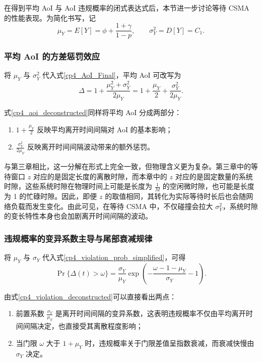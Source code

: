 在得到平均 AoI 与 AoI 违规概率的闭式表达式后，本节进一步讨论等待 CSMA 的性能表现。为简化书写，记
\[
\mu_Y = E[Y] = \phi + \frac{1+\gamma}{1-p},\qquad
\sigma_Y^2 = D[Y] = C_1.
\]

\subsubsection{平均 AoI 的方差惩罚效应}

将 $\mu_Y$ 与 $\sigma_Y^2$ 代入式\eqref{cp4_AoI_Final}，平均 AoI 可改写为
\begin{equation}\label{cp4_aoi_deconstructed}
    \Delta = 1 + \frac{\mu_Y^2 + \sigma_Y^2}{2\mu_Y}
    = 1 + \frac{\mu_Y}{2} + \frac{\sigma_Y^2}{2\mu_Y}.
\end{equation}

式\eqref{cp4_aoi_deconstructed}同样将平均 AoI 分成两部分：
\begin{enumerate}[wide]
    \item $1 + \frac{\mu_Y}{2}$ 反映平均离开时间间隔对 AoI 的基本影响；
    \item $\frac{\sigma_Y^2}{2\mu_Y}$ 反映离开时间间隔波动带来的额外惩罚。
\end{enumerate}

与第三章相比，这一分解在形式上完全一致，但物理含义更为复杂。第三章中的等待窗口 $z$ 对应的是固定长度的离散时隙，而本章中的 $z$ 对应的是固定数量的系统时隙，这些系统时隙在物理时间上可能是长度为 $\frac{1}{M}$ 的空闲微时隙，也可能是长度为 1 的忙碌时隙。因此，即便 $z$ 的取值相同，其转化为实际等待时长后也会随网络负载而发生变化。由此可见，在等待 CSMA 中，不仅碰撞会拉大 $\sigma_Y^2$，系统时隙的变长特性本身也会加剧离开时间间隔的波动。

\subsubsection{违规概率的变异系数主导与尾部衰减规律}

将 $\mu_Y$ 与 $\sigma_Y$ 代入式\eqref{cp4_violation_prob_simplified}，可得
\begin{equation}\label{cp4_violation_deconstructed}
    \Pr\{\Delta(t)>\omega\}=
    \frac{\sigma_Y}{\mu_Y}
    \exp\left(-\frac{\omega-1-\mu_Y}{\sigma_Y}-1\right).
\end{equation}

由式\eqref{cp4_violation_deconstructed}可以直接看出两点：
\begin{enumerate}[wide]
    \item 前置系数 $\frac{\sigma_Y}{\mu_Y}$ 是离开时间间隔的变异系数，这表明违规概率不仅由平均离开时间间隔决定，也直接受其离散程度影响；
    \item 当门限 $\omega$ 大于 $1+\mu_Y$ 时，违规概率关于门限差值呈指数衰减，而衰减快慢由 $\sigma_Y$ 决定。
\end{enumerate}

